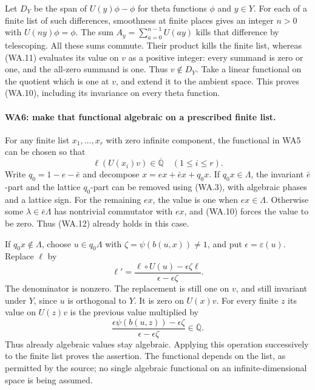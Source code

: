 Let $D_Y$ be the span of $U(y)\phi-\phi$ for theta functions
$\phi$ and $y\in Y$.  For each of a finite list of such differences,
smoothness at finite places gives an integer $n>0$ with
$U(ny)\phi=\phi$.  The sum
$A_y=\sum_{a=0}^{n-1}U(ay)$ kills that difference by telescoping.
All these sums commute.  Their product kills the finite list,
whereas (WA.11) evaluates its value on $v$ as a positive integer:
every summand is zero or one, and the all-zero summand is one.
Thus $v\notin D_Y$.  Take a linear functional on the quotient
which is one at $v$, and extend it to the ambient space.  This
proves (WA.10), including its invariance on every theta function.

\paragraph{WA6: make that functional algebraic on a prescribed finite list.}
For any finite list $x_1,\ldots,x_r$ with zero infinite component,
the functional in WA5 can be chosen so that
\[
                         \ell(U(x_i)v)\in\overline{\mathbb Q}
                                      \quad(1\leq i\leq r). \tag{WA.12}
\]
Write $q_0=1-e-\bar e$ and decompose
$x=ex+\bar ex+q_0x$.  If $q_0x\in\Lambda$, the invariant
$\bar e$-part and the lattice $q_0$-part can be removed using
(WA.3), with algebraic phases and a lattice sign.  For the
remaining $ex$, the value is one when $ex\in\Lambda$.  Otherwise
some $\lambda\in\bar e\Lambda$ has nontrivial commutator with
$ex$, and (WA.10) forces the value to be zero.  Thus (WA.12)
already holds in this case.

If $q_0x\notin\Lambda$, choose $u\in q_0\Lambda$ with
$\zeta=\psi(b(u,x))\ne1$, and put
$\epsilon=\varepsilon(u)$.  Replace $\ell$ by
\[
       \ell'=
       \frac{\ell\circ U(u)-\epsilon\zeta\ell}
                          {\epsilon-\epsilon\zeta}.        \tag{WA.13}
\]
The denominator is nonzero.  The replacement is still one on
$v$, and still invariant under $Y$, since $u$ is orthogonal to
$Y$.  It is zero on $U(x)v$.  For every finite $z$ its value on
$U(z)v$ is the previous value multiplied by
\[
           \frac{\epsilon\psi(b(u,z))-\epsilon\zeta}
                          {\epsilon-\epsilon\zeta}
                         \in\overline{\mathbb Q}.           \tag{WA.14}
\]
Thus already algebraic values stay algebraic.  Applying this
operation successively to the finite list proves the assertion.
The functional depends on the list, as permitted by the source;
no single algebraic functional on an infinite-dimensional space
is being assumed.

